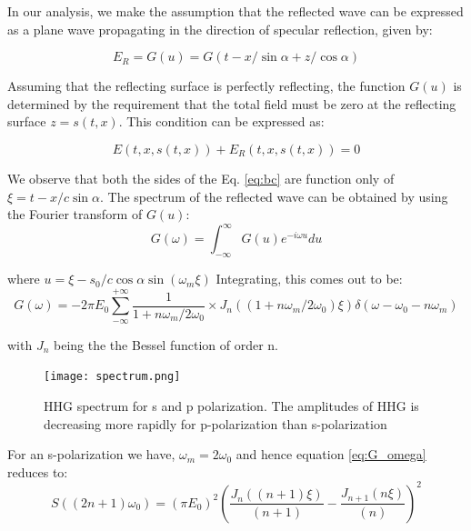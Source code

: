 In our analysis, we make the assumption that the reflected wave can be expressed as a plane wave propagating in the direction of specular reflection, given by:

\begin{equation*}
    E_R = G(u) = G(t - x/\sin\alpha + z/\cos\alpha)
\end{equation*}

Assuming that the reflecting surface is perfectly reflecting, the function $G(u)$ is determined by the requirement that the total field must be zero at the reflecting surface $z = s(t,x)$. This condition can be expressed as:

\begin{equation}
    \label{eq:bc}
    E(t,x,s(t,x)) + E_R(t,x,s(t,x)) = 0
\end{equation}

We observe that both the sides of the Eq. \ref{eq:bc} are function only of $\xi = t - x/c \sin\alpha$. The spectrum of the reflected wave can be obtained by using the Fourier transform of $G(u)$:
\begin{equation*}
    G(\omega) = \int_{-\infty}^{\infty} G(u) e^{-i\omega u} du
\end{equation*}

where $u = \xi - s_0/c \cos\alpha \sin(\omega_m \xi)$ Integrating, this comes out to be:
\begin{equation}
    \label{eq:G_omega}
    G(\omega) = -2 \pi E_0 \sum_{-\infty}^{+\infty} \frac{1}{1+ n\omega_m /2 \omega_0} \times J_n \left(\left( 1+ n\omega_m /2\omega_0\right)\xi\right)\delta \left(\omega - \omega_0 - n\omega_m\right)
\end{equation}

with $J_n$ being the the Bessel function of order n.

\begin{figure}[h]
    \centering
    \texttt{[image: spectrum.png]}
    \caption{HHG spectrum for s and p polarization. The amplitudes of HHG is decreasing more rapidly for p-polarization than s-polarization}
    \label{fig:spectrum}
\end{figure}

For an s-polarization we have, $\omega_m = 2 \omega_0$ and hence equation \ref{eq:G_omega} reduces to:
\begin{equation}
    \label{eq:s-spectrum}
    S((2n+1)\omega_0) = (\pi E_0)^2\left(\frac{J_n((n+1)\xi)}{(n+1)}- \frac{J_{n+1}(n\xi)}{(n)}\right)^2
\end{equation}

